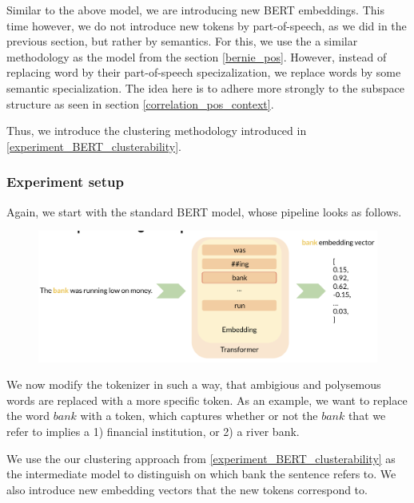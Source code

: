 \documentclass[a4paper,12pt,twoside,openright]{report}
\begin{document}
Similar to the above model, we are introducing new BERT embeddings.
This time however, we do not introduce new tokens by part-of-speech, as we did in the previous section, but rather by semantics.
For this, we use the a similar methodology as the model from the section \ref{bernie_pos}.
However, instead of replacing word by their part-of-speech specizalization, we replace words by some semantic specialization.
The idea here is to adhere more strongly to the subspace structure as seen in section \ref{correlation_pos_context}.

Thus, we introduce the clustering methodology introduced in \ref{experiment_BERT_clusterability}.

\subsubsection{Experiment setup}

Again, we start with the standard BERT model, whose pipeline looks as follows.
\begin{figure}[H]
	\center
  \includegraphics[width=\linewidth]{./assets/experiments/pipeline_tokenizer_BERnie_meaning_.png}
  \caption{}
  \label{fig:cbow_skipgram}
\end{figure}

We now modify the tokenizer in such a way, that ambigious and polysemous words are replaced with a more specific token.
As an example, we want to replace the word $bank$ with a token, which captures whether or not the $bank$ that we refer to implies a 1) financial institution, or 2) a river bank.

We use the our clustering approach from \ref{experiment_BERT_clusterability} as the intermediate model to distinguish on which bank the sentence refers to.
We also introduce new embedding vectors that the new tokens correspond to.
\end{document}
